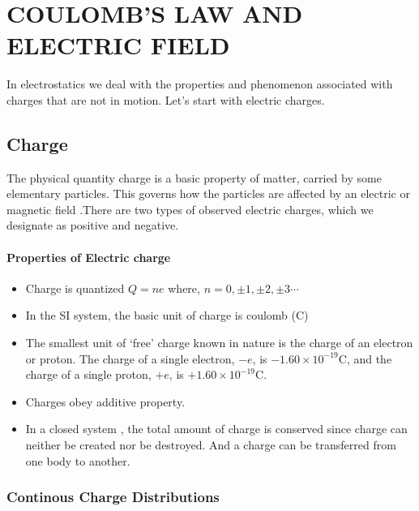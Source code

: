 \chapter{COULOMB'S LAW AND ELECTRIC FIELD}



In electrostatics we deal with the properties and phenomenon associated with charges that are not in motion. Let's start with electric charges.
\section{Charge}
\begin{definition}
	The physical quantity charge is a basic property of matter, carried by some elementary particles. This governs how the particles are affected by an electric or magnetic field .There  are  two  types  of  observed  electric  charges,  which  we  designate  as  positive  and  negative.
\end{definition}
\subsubsection{Properties of Electric charge}
\begin{itemize}
	\item Charge is quantized $Q=ne$ where, $ n=0,\pm1,\pm2,\pm3 \cdots$
	\item In the SI system, the basic unit of charge is coulomb (C)
	\item  The smallest unit of `free' charge known in nature is the charge of an electron or proton. The charge of a single electron, $-e$, is $-1.60 \times 10^{-19} \mathrm{C}$, and the charge of a single proton, $+e$, is $+1.60 \times 10^{-19} \mathrm{C} .$
	\item Charges obey additive property.
	\item In a closed system , the total amount of charge is conserved since charge can neither be created nor be destroyed. And a charge can be transferred from one body to another.
\end{itemize}
\subsection{Continous Charge Distributions}
\bigskip
